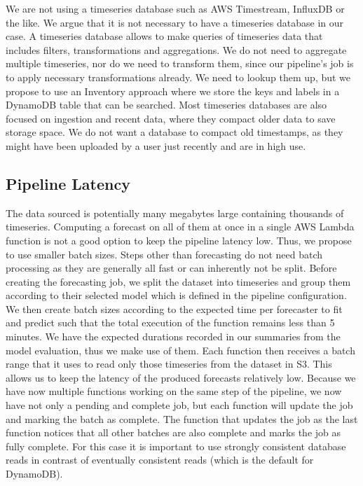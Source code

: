 We are not using a timeseries database such as AWS Timestream, InfluxDB or the like. We argue that it is not necessary to have a timeseries database in our case. A timeseries database allows to make queries of timeseries data that includes filters, transformations and aggregations. We do not need to aggregate multiple timeseries, nor do we need to transform them, since our pipeline's job is to apply necessary transformations already. We need to lookup them up, but we propose to use an Inventory approach where we store the keys and labels in a DynamoDB table that can be searched. Most timeseries databases are also focused on ingestion and recent data, where they compact older data to save storage space. We do not want a database to compact old timestamps, as they might have been uploaded by a user just recently and are in high use.

\subsection{Pipeline Latency}

The data sourced is potentially many megabytes large containing thousands of timeseries. Computing a forecast on all of them at once in a single AWS Lambda function is not a good option to keep the pipeline latency low. Thus, we propose to use smaller batch sizes. Steps other than forecasting do not need batch processing as they are generally all fast or can inherently not be split. Before creating the forecasting job, we split the dataset into timeseries and group them according to their selected model which is defined in the pipeline configuration. We then create batch sizes according to the expected time per forecaster to fit and predict such that the total execution of the function remains less than 5 minutes. We have the expected durations recorded in our summaries from the model evaluation, thus we make use of them. Each function then receives a batch range that it uses to read only those timeseries from the dataset in S3. This allows us to keep the latency of the produced forecasts relatively low. Because we have now multiple functions working on the same step of the pipeline, we now have not only a pending and complete job, but each function will update the job and marking the batch as complete. The function that updates the job as the last function notices that all other batches are also complete and marks the job as fully complete. For this case it is important to use strongly consistent database reads in contrast of eventually consistent reads (which is the default for DynamoDB).

